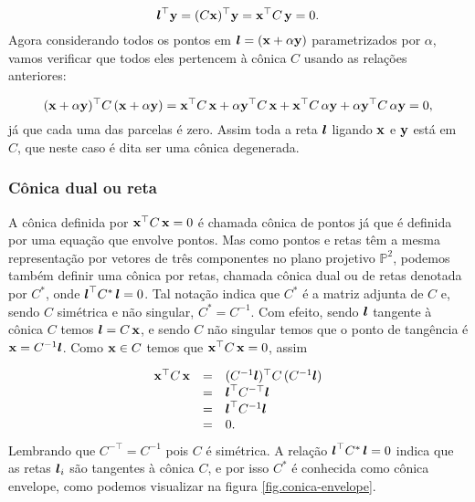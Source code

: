\begin{equation*}
\boldsymbol{l}^\top{\bf y}=(C\mathbf{x})^\top{\bf y}=\mathbf{x}^\top C\,{\bf y}=0.
\end{equation*}  
Agora considerando todos os pontos em $\boldsymbol{l}=(\mathbf{x}+\alpha{\bf y})$ parametrizados por $\alpha$, vamos verificar que todos eles pertencem à cônica $C$ usando as relações anteriores:

\begin{equation*}
(\mathbf{x}+\alpha{\bf y})^\top C\,(\mathbf{x}+\alpha{\bf y})=\mathbf{x}^\top C\,\mathbf{x}+\alpha{\bf y}^\top C\,\mathbf{x}+\mathbf{x}^\top C\,\alpha{\bf y}+\alpha{\bf y}^\top C\,\alpha{\bf y}=0,
\end{equation*}
já que cada uma das parcelas é zero. Assim toda a reta $\boldsymbol{l}$ ligando $\mathbf{x}$ e ${\bf y}$ está em $C$, que neste caso é dita ser uma cônica degenerada.\\

\subsubsection{Cônica dual ou reta}\label{sec.conica-dual} 

A cônica definida por $\mathbf{x}^\top C\,\mathbf{x}=0$ é chamada cônica de pontos já que é definida por uma equação que envolve pontos. Mas como pontos e retas têm a mesma representação por vetores de três componentes no plano projetivo $\mathbb{P}^2$, podemos também definir uma cônica por retas, chamada cônica dual ou de retas denotada por $C^*$, onde $\boldsymbol{l}^\top C^*\,\boldsymbol{l}=0$. Tal notação indica que $C^*$ é a matriz adjunta de $C$ e, sendo $C$ simétrica e não singular, $C^*=C^{-1}$. Com efeito, sendo $\boldsymbol{l}$ tangente à cônica $C$ temos $\boldsymbol{l}=C\,\mathbf{x}$, e sendo $C$ não singular temos que o ponto de tangência é $\mathbf{x}=C^{-1}\boldsymbol{l}$. Como $\mathbf{x}\in C$ temos que $\mathbf{x}^\top C\,\mathbf{x}=0$, assim

\begin{equation*}
\begin{array}{rcl}
\mathbf{x}^\top C\,\mathbf{x}&=&(C^{-1}\boldsymbol{l})^\top C\,(
C^{-1}\boldsymbol{l})\\
&=&\boldsymbol{l}^\top C^{-\top}\boldsymbol{l}\\
&=&\boldsymbol{l}^\top C^{-1}\boldsymbol{l}\\
&=&0.
\end{array}
\end{equation*}
Lembrando que $C^{-\top}=C^{-1}$ pois $C$ é simétrica. A relação $\boldsymbol{l}^\top C^*\,\boldsymbol{l}=0$ indica que as retas $\boldsymbol{l}_i$ são tangentes à cônica $C$, e por isso $C^*$ é conhecida como cônica envelope, como podemos visualizar na figura \ref{fig.conica-envelope}.

